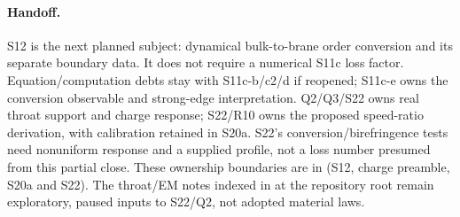 \paragraph{Handoff.}
S12 is the next planned subject: dynamical bulk-to-brane order conversion
and its separate boundary data. It does not require a numerical S11c loss
factor. Equation/computation debts stay with S11c-b/c2/d if reopened;
S11c-e owns the conversion observable and strong-edge interpretation.
Q2/Q3/S22 owns real throat support and charge response; S22/R10 owns the
proposed speed-ratio derivation, with calibration retained in S20a.
S22's conversion/birefringence tests need nonuniform response and a supplied
profile, not a loss number presumed from this partial close.
These ownership boundaries are in  (S12, charge
preamble, S20a and S22). The throat/EM notes indexed in
 at the repository root
remain exploratory, paused inputs to S22/Q2, not adopted material laws.
